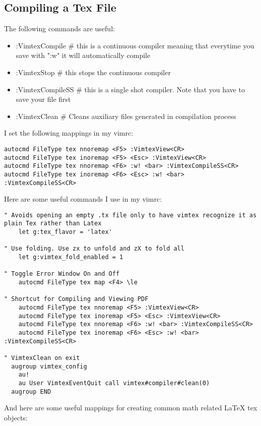\subsection{Compiling a Tex File}
The following commands are useful:
\begin{itemize}
    \item :VimtexCompile \# this is a continuous compiler meaning that everytime
        you save with ":w" it will automatically compile
    \item :VimtexStop \# this stops the continuous compiler
    \item :VimtexCompileSS \# this is a single shot compiler. Note that you have
        to save your file first \item :VimtexClean \# Cleans auxiliary files
        generated in compilation process
\end{itemize}
I set the following mappings in my vimrc:
\begin{lstlisting}
autocmd FileType tex nnoremap <F5> :VimtexView<CR>
autocmd FileType tex inoremap <F5> <Esc> :VimtexView<CR>
autocmd FileType tex nnoremap <F6> :w! <bar> :VimtexCompileSS<CR>
autocmd FileType tex inoremap <F6> <Esc> :w! <bar> :VimtexCompileSS<CR>
\end{lstlisting}
Here are some useful commands I use in my vimrc:
\begin{lstlisting}
" Avoids opening an empty .tx file only to have vimtex recognize it as plain Tex rather than Latex
    let g:tex_flavor = 'latex'

" Use folding. Use zx to unfold and zX to fold all
    let g:vimtex_fold_enabled = 1

" Toggle Error Window On and Off
    autocmd FileType tex map <F4> \le

" Shortcut for Compiling and Viewing PDF
    autocmd FileType tex nnoremap <F5> :VimtexView<CR>
    autocmd FileType tex inoremap <F5> <Esc> :VimtexView<CR>
    autocmd FileType tex nnoremap <F6> :w! <bar> :VimtexCompileSS<CR>
    autocmd FileType tex inoremap <F6> <Esc> :w! <bar> :VimtexCompileSS<CR>

" VimtexClean on exit
  augroup vimtex_config
    au!
    au User VimtexEventQuit call vimtex#compiler#clean(0)
  augroup END
\end{lstlisting}
And here are some useful mappings for creating common math related LaTeX tex
objects:
